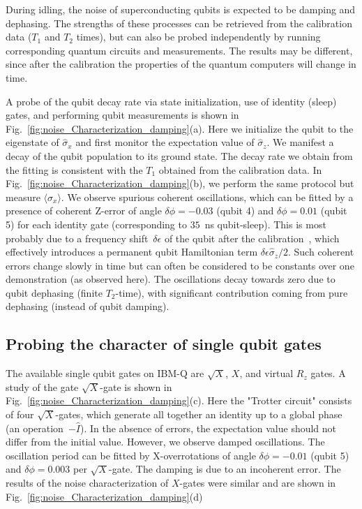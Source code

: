 \documentclass[twocolumn,amsmath,amssymb,pra]{revtex4-2}
\begin{document}
During idling, the noise of superconducting qubits is expected to be damping and dephasing.
The strengths of these processes can be retrieved from the calibration data ($T_1$ and $T_2$ times),
but can also be probed independently by running corresponding quantum circuits and measurements.
The results may be different, since after the calibration the properties of the quantum computers will change in time.

A probe of the qubit decay rate via state initialization,
use of identity (sleep) gates, and performing qubit measurements is shown in Fig.~\ref{fig:noise_Characterization_damping}(a).
Here we initialize the qubit to the eigenstate of $\hat\sigma_x$ and first monitor the expectation value of $\hat\sigma_z$.
We manifest a decay of the qubit population to its ground state.
The decay rate we obtain from the fitting is consistent with the $T_1$ obtained from the calibration data.
In Fig.~\ref{fig:noise_Characterization_damping}(b), we perform the same protocol but measure $\langle \hat\sigma_x\rangle$.
We observe spurious coherent oscillations,
which can be fitted by a presence of coherent Z-error of angle $\delta \phi=-0.03$ (qubit 4) and $\delta \phi = 0.01 $ (qubit 5) for each identity gate (corresponding to $35$~ns qubit-sleep).
This is most probably due to a frequency shift~$\delta\epsilon$ of the qubit after the calibration~\cite{Klimov_2018,Schl_r_2019},
which effectively introduces a permanent qubit Hamiltonian term $\delta\epsilon\hat\sigma_z/2$.
Such coherent errors change slowly in time but can often be
considered to be constants over one demonstration (as observed here).
The oscillations decay towards zero due to qubit dephasing (finite $T_2$-time),
with significant contribution coming from pure dephasing (instead of qubit damping).



\subsection{Probing the character of single qubit gates}\label{sec:noise_Rx}

The available single qubit gates on IBM-Q are $\sqrt{X}$, $X$, and virtual $R_z$ gates.
A study of the gate $\sqrt{X}$-gate is shown in Fig.~\ref{fig:noise_Characterization_damping}(c).
Here the "Trotter circuit" consists of four $\sqrt{X}$-gates, which generate all together an identity up to a global phase (an operation~$-\hat I$).
In the absence of errors, the expectation value should not differ from the initial value.
However, we observe damped oscillations.
The oscillation period can be fitted by X-overrotations of angle $\delta\phi=-0.01$ (qubit 5) and $\delta\phi=0.003$  per $\sqrt{X}$-gate.
The damping is due to an incoherent error.
The results of the noise characterization of $X$-gates were similar and are shown in Fig.~\ref{fig:noise_Characterization_damping}(d)
\end{document}

